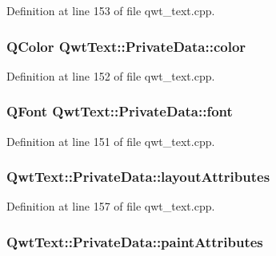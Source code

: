 Definition at line 153 of file qwt\-\_\-text.\-cpp.

\hypertarget{class_qwt_text_1_1_private_data_a604e431cfccea5e98d6164e8e17ad37e}{
\subsubsection[{color}]{\setlength{\rightskip}{0pt plus 5cm}Q\-Color Qwt\-Text\-::\-Private\-Data\-::color}}\label{class_qwt_text_1_1_private_data_a604e431cfccea5e98d6164e8e17ad37e}


Definition at line 152 of file qwt\-\_\-text.\-cpp.

\hypertarget{class_qwt_text_1_1_private_data_a91298bf899633988604c34d0784d8cad}{
\subsubsection[{font}]{\setlength{\rightskip}{0pt plus 5cm}Q\-Font Qwt\-Text\-::\-Private\-Data\-::font}}\label{class_qwt_text_1_1_private_data_a91298bf899633988604c34d0784d8cad}


Definition at line 151 of file qwt\-\_\-text.\-cpp.

\hypertarget{class_qwt_text_1_1_private_data_a57e9e8baa197adaf87f8ec04fc72d6b3}{
\subsubsection[{layout\-Attributes}]{ Qwt\-Text\-::\-Private\-Data\-::layout\-Attributes}}\label{class_qwt_text_1_1_private_data_a57e9e8baa197adaf87f8ec04fc72d6b3}


Definition at line 157 of file qwt\-\_\-text.\-cpp.

\hypertarget{class_qwt_text_1_1_private_data_a7c4cea044e466e12174294f85a74092b}{
\subsubsection[{paint\-Attributes}]{ Qwt\-Text\-::\-Private\-Data\-::paint\-Attributes}}\label{class_qwt_text_1_1_private_data_a7c4cea044e466e12174294f85a74092b}


